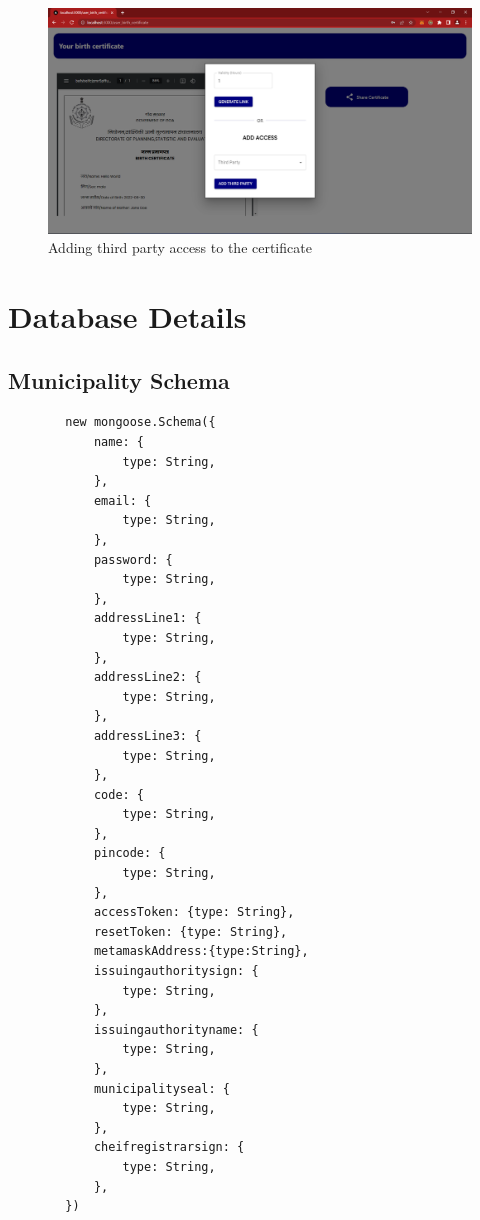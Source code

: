     \begin{figure}[H]
        \centering
        \includegraphics[width=\textwidth]{imgs/adding3rdpartyacess.png}
        \caption{Adding third party access to the certificate}
        \label{fig:Adding third party access to the certificate}
        \end{figure}

\section{Database Details}
    \subsection{Municipality Schema}
    \begin{lstlisting}
        new mongoose.Schema({
            name: {
                type: String,
            },
            email: {
                type: String,
            },
            password: {
                type: String,
            },
            addressLine1: {
                type: String,
            },
            addressLine2: {
                type: String,
            },
            addressLine3: {
                type: String,
            },
            code: {
                type: String,
            },
            pincode: {
                type: String,
            },
            accessToken: {type: String},
            resetToken: {type: String},
            metamaskAddress:{type:String},
            issuingauthoritysign: {
                type: String,
            },
            issuingauthorityname: {
                type: String,
            },
            municipalityseal: {
                type: String,
            },
            cheifregistrarsign: {
                type: String,
            },
        })
    \end{lstlisting}

